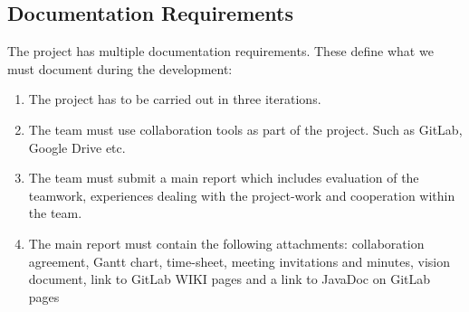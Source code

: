 \documentclass{article}
\begin{document}
\subsection{Documentation Requirements}
The project has multiple documentation requirements. These define what we must document during the development:
\begin{enumerate}
    \item The project has to be carried out in three iterations. 
    \item The team must use collaboration tools as part of the project. Such as GitLab, Google Drive etc.
    \item The team must submit a main report which includes evaluation of the teamwork, experiences dealing with the project-work and cooperation within the team.
    \item The main report must contain the following attachments: collaboration agreement, Gantt chart, time-sheet, meeting invitations and minutes, vision document, link to GitLab WIKI pages and a link to JavaDoc on GitLab pages
\end{enumerate}
\end{document}

